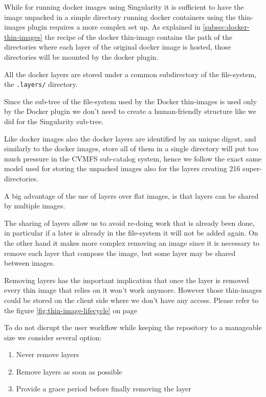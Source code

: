 While for running docker images using Singularity it is sufficient to have the
image unpacked in a simple directory running docker containers using the
thin-images plugin requires a more complex set up.  As explained in
\ref{subsec:docker-thin-images} the recipe of the docker thin-image contains
the path of the directories where each layer of the original docker image is
hosted, those directories will be mounted by the docker plugin.

All the docker layers are stored under a common subdirectory of the
file-system, the \texttt{.layers/} directory.

Since the sub-tree of the file-system used by the Docker thin-images is used only
by the Docker plugin we don't need to create a human-friendly structure like we
did for the Singularity sub-tree.

Like docker images also the docker layers are identified by an unique digest,
and similarly to the docker images, store all of them in a single directory
will put too much pressure in the CVMFS sub-catalog system, hence we follow the
exact same model used for storing the unpacked images also for the layers
creating 216 super-directories.

A big advantage of the use of layers over flat images, is that layers can be
shared by multiple images.

The sharing of layers allow us to avoid re-doing work that is already been
done, in particular if a later is already in the file-system it will not be
added again. On the other hand it makes more complex removing an image since it
is necessary to remove each layer that compose the image, but some layer may be
shared between images.

Removing layers has the important implication that once the layer is removed
every thin image that relies on it won’t work anymore.  However those
thin-images could be stored on the client side where we don’t have any access.
Please refer to the figure \ref{fig:thin-image-lifecycle} on page
\pageref{fig:thin-image-lifecycle}

To do not disrupt the user workflow while keeping the repository to a manageable
size we consider several option: 
\begin{enumerate}
\item Never remove layers
\item Remove layers as soon as possible
\item Provide a grace period before finally removing the layer
\end{enumerate}

